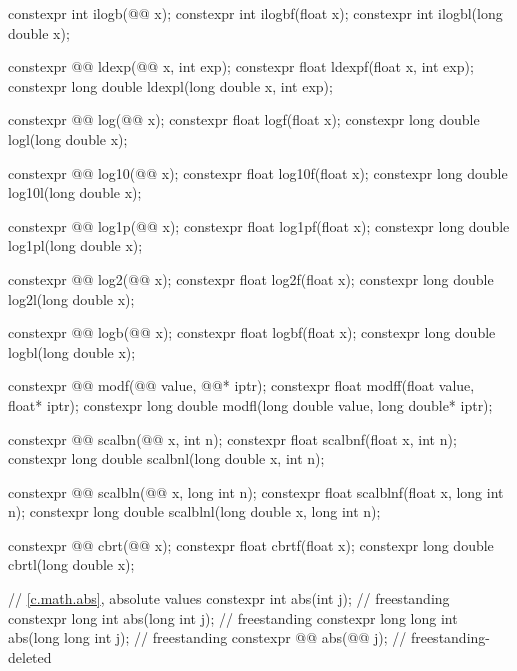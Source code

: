 \begin{codeblock}
{  constexpr int ilogb(@@ x);
  constexpr int ilogbf(float x);
  constexpr int ilogbl(long double x);

  constexpr @@ ldexp(@@ x, int exp);
  constexpr float ldexpf(float x, int exp);
  constexpr long double ldexpl(long double x, int exp);

  constexpr @@ log(@@ x);
  constexpr float logf(float x);
  constexpr long double logl(long double x);

  constexpr @@ log10(@@ x);
  constexpr float log10f(float x);
  constexpr long double log10l(long double x);

  constexpr @@ log1p(@@ x);
  constexpr float log1pf(float x);
  constexpr long double log1pl(long double x);

  constexpr @@ log2(@@ x);
  constexpr float log2f(float x);
  constexpr long double log2l(long double x);

  constexpr @@ logb(@@ x);
  constexpr float logbf(float x);
  constexpr long double logbl(long double x);

  constexpr @@ modf(@@ value, @@* iptr);
  constexpr float modff(float value, float* iptr);
  constexpr long double modfl(long double value, long double* iptr);

  constexpr @@ scalbn(@@ x, int n);
  constexpr float scalbnf(float x, int n);
  constexpr long double scalbnl(long double x, int n);

  constexpr @@ scalbln(@@ x, long int n);
  constexpr float scalblnf(float x, long int n);
  constexpr long double scalblnl(long double x, long int n);

  constexpr @@ cbrt(@@ x);
  constexpr float cbrtf(float x);
  constexpr long double cbrtl(long double x);

  // \ref{c.math.abs}, absolute values
  constexpr int abs(int j);                                             // freestanding
  constexpr long int abs(long int j);                                   // freestanding
  constexpr long long int abs(long long int j);                         // freestanding
  constexpr @@ abs(@@ j);            // freestanding-deleted

}
\end{codeblock}

